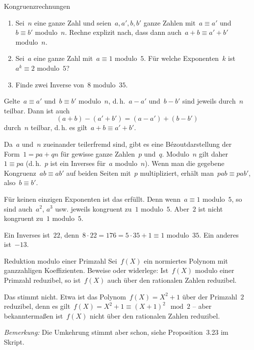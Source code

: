\documentclass{algblatt}
\begin{document}
\begin{aufgabe}{Kongruenzrechnungen}
\begin{enumerate}
\item Sei~$n$ eine ganze Zahl und seien~$a,a', b,b'$ ganze Zahlen mit~$a \equiv
a'$ und~$b \equiv b'$ modulo~$n$. Rechne explizit nach, dass dann auch~$a+b
\equiv a'+b'$ modulo~$n$.
\item Sei~$a$ eine ganze Zahl mit~$a \equiv 1$ modulo~$5$. Für welche
Exponenten~$k$ ist~$a^k \equiv 2$ modulo~$5$?
\item Finde zwei Inverse von~$8$ modulo~$35$.
\end{enumerate}

\begin{loesungE}
\item Gelte~$a \equiv a'$ und~$b \equiv b'$ modulo~$n$, d.\,h.~$a - a'$ und~$b
- b'$ sind jeweils durch~$n$ teilbar. Dann ist auch
\[ (a+b) - (a'+b') = (a-a') + (b-b') \]
durch~$n$ teilbar, d.\,h. es gilt~$a+b \equiv a'+b'$.

\item Da~$a$ und~$n$ zueinander teilerfremd sind, gibt es eine
Bézoutdarstellung der Form~$1 = pa + qn$ für gewisse ganze Zahlen~$p$ und~$q$.
Modulo~$n$ gilt daher~$1 \equiv p a$ (d.\,h.~$p$ ist ein Inverses für~$a$
modulo~$n$). Wenn man die gegebene Kongruenz~$ab \equiv ab'$ auf beiden Seiten
mit~$p$ multipliziert, erhält man~$pab \equiv pab'$, also~$b \equiv b'$.

\item Für keinen einzigen Exponenten ist das erfüllt. Denn wenn~$a \equiv 1$
modulo~$5$, so sind auch~$a^2$, $a^3$ usw. jeweils kongruent zu~$1$ modulo~$5$.
Aber~$2$ ist nicht kongruent zu~$1$ modulo~$5$.

\item Ein Inverses ist~$22$, denn~$8 \cdot 22 = 176 = 5 \cdot 35 + 1 \equiv 1$
modulo~$35$. Ein anderes ist~$-13$.
\end{loesungE}
\end{aufgabe}

\begin{aufgabe}{Reduktion modulo einer Primzahl}
Sei~$f(X)$ ein normiertes Polynom mit ganzzahligen Koeffizienten. Beweise oder
widerlege: Ist~$f(X)$ modulo einer Primzahl reduzibel, so ist~$f(X)$ auch über
den rationalen Zahlen reduzibel.

\begin{loesung}
Das stimmt nicht. Etwa ist das Polynom~$f(X) = X^2 + 1$ über der Primzahl~$2$
reduzibel, denn es gilt~$f(X) = X^2 + 1 \equiv (X + 1)^2 \mod 2$ -- aber
bekanntermaßen ist~$f(X)$ nicht über den rationalen Zahlen reduzibel.

\emph{Bemerkung:} Die Umkehrung stimmt aber schon, siehe Proposition~3.23 im
Skript.
\end{loesung}
\end{aufgabe}
\end{document}
